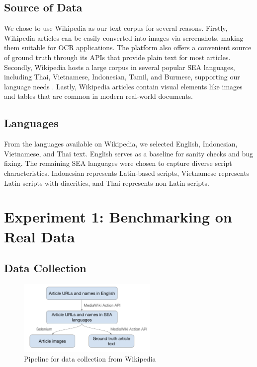 \documentclass[12pt,oneside]{memoir}
\begin{document}
\subsection{Source of Data}

We chose to use Wikipedia as our text corpus for several reasons.
Firstly, Wikipedia articles can be easily converted into images via screenshots, making them suitable for OCR applications. 
The platform also offers a convenient source of ground truth through its APIs that provide plain text for most articles.
Secondly, Wikipedia hosts a large corpus in several popular SEA languages, including Thai, Vietnamese, Indonesian, Tamil, and Burmese, supporting our language needs \parencite{list-of-wikipedias-2024}. 
Lastly, Wikipedia articles contain visual elements like images and tables that are common in modern real-world documents.

\subsection{Languages}
From the languages available on Wikipedia, we selected English, Indonesian, Vietnamese, and Thai text. 
English serves as a baseline for sanity checks and bug fixing.
The remaining SEA languages were chosen to capture diverse script characteristics. 
Indonesian represents Latin-based scripts, Vietnamese represents Latin scripts with diacritics, and Thai represents non-Latin scripts. 

\section{Experiment 1: Benchmarking on Real Data}

\subsection{Data Collection}

\begin{figure}[ht]
    \centering
    \includegraphics[width=0.6\textwidth]{images/data-collection.png}
    \caption{Pipeline for data collection from Wikipedia}
    \label{figure:data-collection}
\end{figure}
\end{document}
